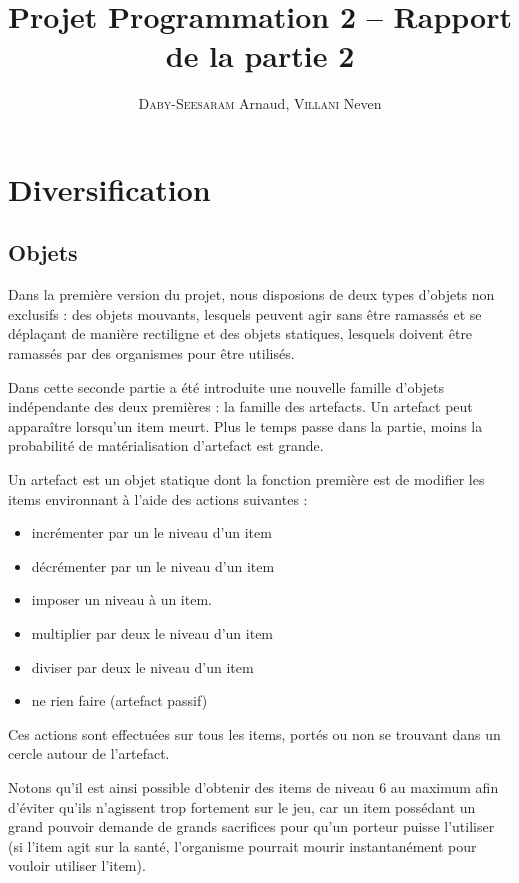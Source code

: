 \documentclass[a4paper,french]{article}
\title{Projet Programmation 2 -- Rapport de la partie 2}
\author{\textsc{Daby-Seesaram} Arnaud, \textsc{Villani} Neven}
\date{}
\begin{document}
\maketitle

\section{Diversification}

\subsection{Objets}
Dans la première version du projet, nous disposions de deux types d'objets non
exclusifs : des objets mouvants, lesquels peuvent agir sans être ramassés et se
déplaçant de manière rectiligne et des objets statiques, lesquels doivent être
ramassés par des organismes pour être utilisés.

Dans cette seconde partie a été introduite une nouvelle famille d'objets
indépendante des deux premières : la famille des artefacts.
Un artefact peut apparaître lorsqu'un item meurt. Plus le temps passe dans la
partie, moins la probabilité de matérialisation d'artefact est grande.

Un artefact est un objet statique dont la fonction première est de modifier les
items environnant à l'aide des actions suivantes :
\begin{itemize}
    \item incrémenter par un le niveau d'un item
    \item décrémenter par un le niveau d'un item
    \item imposer un niveau à un item.
    \item multiplier par deux le niveau d'un item
    \item diviser par deux le niveau d'un item
    \item ne rien faire (artefact passif)
\end{itemize}

Ces actions sont effectuées sur tous les items, portés ou non se trouvant dans
un cercle autour de l'artefact.

Notons qu'il est ainsi possible d'obtenir des items de niveau 6 au maximum afin
d'éviter qu'ils n'agissent trop fortement sur le jeu, car un item possédant un
grand pouvoir demande de grands sacrifices pour qu'un porteur puisse l'utiliser
(si l'item agit sur la santé, l'organisme pourrait mourir instantanément pour
vouloir utiliser l'item).
\end{document}
